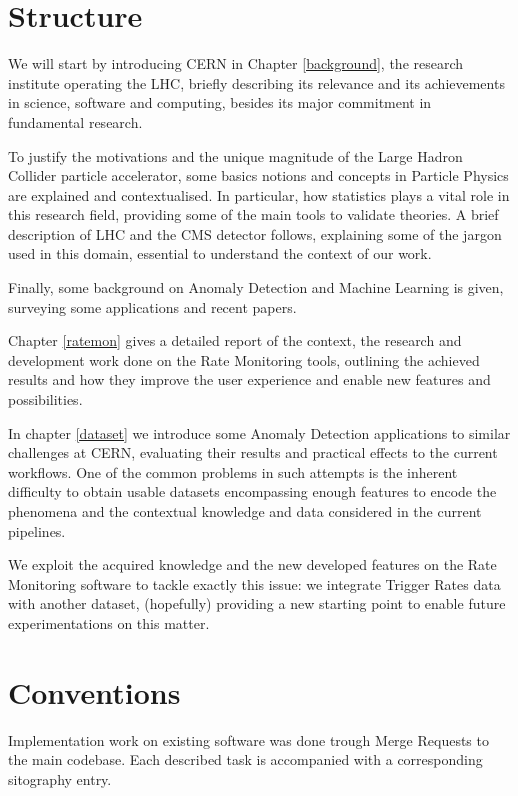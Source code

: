\section{Structure}

We will start by introducing CERN in Chapter \ref{background}, the research institute operating the LHC, briefly describing its relevance and its achievements in science, software and computing, besides its major commitment in fundamental research.

To justify the motivations and the unique magnitude of the Large Hadron Collider particle accelerator, some basics notions and concepts in Particle Physics are explained and contextualised. In particular, how statistics plays a vital role in this research field, providing some of the main tools to validate theories. A brief description of LHC and the CMS detector follows, explaining some of the jargon used in this domain, essential to understand the context of our work.

Finally, some background on Anomaly Detection and Machine Learning is given, surveying some applications and recent papers.

Chapter \ref{ratemon} gives a detailed report of the context, the research and development work done on the Rate Monitoring tools, outlining the achieved results and how they improve the user experience and enable new features and possibilities.

In chapter \ref{dataset} we introduce some Anomaly Detection applications to similar challenges at CERN, evaluating their results and practical effects to the current workflows. One of the common problems in such attempts is the inherent difficulty to obtain usable datasets encompassing enough features to encode the phenomena and the contextual knowledge and data considered in the current pipelines.

We exploit the acquired knowledge and the new developed features on the Rate Monitoring software to tackle exactly this issue: we integrate Trigger Rates data with another dataset, (hopefully) providing a new starting point to enable future experimentations on this matter.


\section{Conventions}

Implementation work on existing software was done trough Merge Requests to the main codebase. Each described task is accompanied with a corresponding sitography entry.

